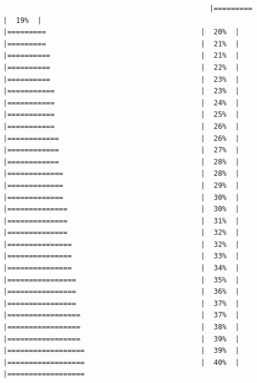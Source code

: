 \documentclass[
  krantz2]{krantz}
\begin{document}
\begin{verbatim}
                                                |=========                                    |  19%  |                                                     |=========                                    |  20%  |                                                     |=========                                    |  21%  |                                                     |==========                                   |  21%  |                                                     |==========                                   |  22%  |                                                     |==========                                   |  23%  |                                                     |===========                                  |  23%  |                                                     |===========                                  |  24%  |                                                     |===========                                  |  25%  |                                                     |===========                                  |  26%  |                                                     |============                                 |  26%  |                                                     |============                                 |  27%  |                                                     |============                                 |  28%  |                                                     |=============                                |  28%  |                                                     |=============                                |  29%  |                                                     |=============                                |  30%  |                                                     |==============                               |  30%  |                                                     |==============                               |  31%  |                                                     |==============                               |  32%  |                                                     |===============                              |  32%  |                                                     |===============                              |  33%  |                                                     |===============                              |  34%  |                                                     |================                             |  35%  |                                                     |================                             |  36%  |                                                     |================                             |  37%  |                                                     |=================                            |  37%  |                                                     |=================                            |  38%  |                                                     |=================                            |  39%  |                                                     |==================                           |  39%  |                                                     |==================                           |  40%  |                                                     |==================            
\end{verbatim}
\end{document}
